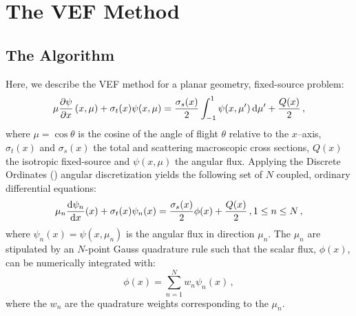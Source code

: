 
\newcommand{\rell}{^\ell} %
\newcommand{\relll}{^{\ell+1}} %
\newcommand{\rellh}{^{\ell+1/2}} %

\newcommand{\paren}[1]{\left(#1\right)} 
\newcommand{\br}[1]{\left[#1\right]}
\newcommand{\curl}[1]{\left\{#1\right\}}

\newcommand{\eddphi}[1]{\edd_{#1}\phi_{#1}}
\newcommand{\ALPHA}[2]{\frac{#1}{\sigma_{t,#2} h_{#2}}}

\section{The VEF Method}
\subsection{The Algorithm}
Here, we describe the VEF method for a planar geometry, fixed-source problem:
	\begin{equation} 
		\mu \pderiv{\psi}{x} \paren{x, \mu} + \sigma_t(x) \psi(x,\mu) = 
			\frac{\sigma_s(x)}{2} \int_{-1}^1 \psi(x,\mu') \ud \mu' + \frac{Q(x)}{2} \,,
	\end{equation}
where $\mu = \cos\theta$ is the cosine of the angle of flight $\theta$ relative to the $x$--axis, $\sigma_t(x)$ and $\sigma_s(x)$ the total and scattering macroscopic cross sections, $Q(x)$ the isotropic fixed-source and $\psi(x, \mu)$ the angular flux. Applying the Discrete Ordinates (\SN) angular discretization yields the following set of $N$ coupled, ordinary differential equations: 
	\begin{equation} \label{eq:sn}
		\mu_n \frac{\mathop{}\!\mathrm{d} \psi_n}{\mathop{}\!\mathrm{d} x}(x) + \sigma_t(x) \psi_n(x) = 
		\frac{\sigma_s(x)}{2} \phi(x) + \frac{Q(x)}{2} \,, 1 \leq n \leq N \,,
	\end{equation}
where $\psi_n(x) = \psi(x, \mu_n)$ is the angular flux in direction $\mu_n$. The $\mu_n$ are stipulated by an $N$-point Gauss quadrature rule such that the scalar flux, $\phi(x)$, can be numerically integrated with: 
	\begin{equation} \label{eq:phiquad}
		\phi(x) = \sum_{n=1}^N w_n \psi_n(x) \,,
	\end{equation}
where the $w_n$ are the quadrature weights corresponding to the $\mu_n$. 

